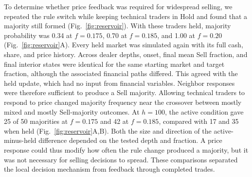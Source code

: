 To determine whether price feedback was required for widespread selling,
we repeated the rule switch while keeping technical traders in Hold and
found that a majority still formed (Fig.~\ref{fig:reservoir}).
With these traders held, majority probability was 0.34
at $f=0.175$, 0.70 at $f=0.185$, and
1.00 at $f=0.20$ (Fig.~\ref{fig:reservoir}A).
Every held market was simulated again with its full cash, share, and price
history. Across dealer depths, onset, final mean Sell fraction, and final
interior states were identical for the same starting market and target
fraction, although the associated financial paths differed. This agreed
with the held update, which had no input from financial variables. Neighbor responses
were therefore sufficient to produce a Sell majority. Allowing
technical traders to respond to price changed majority frequency near
the crossover between mostly mixed and mostly Sell-majority outcomes.
At $h=100$, the active condition gave 25 of 50
majorities at $f=0.175$ and 42 at $f=0.185$,
compared with 17 and
35 when held (Fig.~\ref{fig:reservoir}A,B).
Both the size and direction of the active-minus-held difference depended
on the tested depth and fraction. A price response could thus modify
how often the rule change produced a majority, but it was not necessary
for selling decisions to spread. These comparisons separated the local
decision mechanism from feedback through completed trades.




